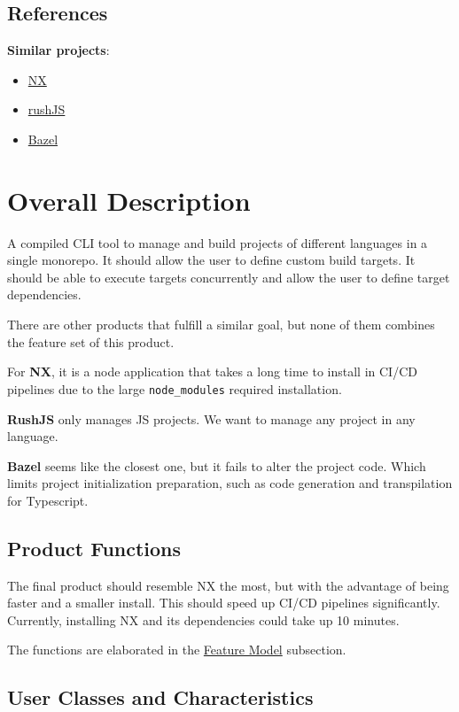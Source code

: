 \documentclass[11pt]{article}
\begin{document}
\subsection{References}

\textbf{Similar projects}:
\begin{itemize}
\item \href{https://nx.dev/}{NX}
\item \href{https://rushjs.io/}{rushJS}
\item \href{https://bazel.build/}{Bazel}
\end{itemize}

\section{Overall Description}

A compiled CLI tool to manage and build projects of different languages in a
single monorepo. It should allow the user to define custom build \glspl{target}.
It should be able to execute \glspl{target} concurrently and allow the user to
define \gls{target} dependencies.

There are other products that fulfill a similar goal, but none of them combines
the feature set of this product.

For \textbf{NX}, it is a node application that takes a long time to install in
CI/CD pipelines due to the large \texttt{node\_modules} required installation.

\textbf{RushJS} only manages JS projects. We want to manage any project in any language.

\textbf{Bazel} seems like the closest one, but it fails to alter the project
code. Which limits project initialization preparation, such as code generation
and transpilation for Typescript.

\subsection{Product Functions}

The final product should resemble NX the most, but with the advantage of being
faster and a smaller install. This should speed up CI/CD pipelines
significantly. Currently, installing NX and its dependencies could take up 10
minutes.

The functions are elaborated in the \hyperref[fig:feature]{Feature Model} subsection.

\subsection{User Classes and Characteristics}
\end{document}
